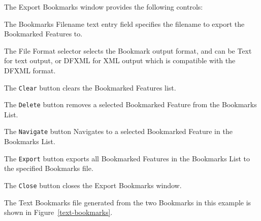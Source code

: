 \documentclass[10pt,twoside]{article}
\begin{document}
The Export Bookmarks window provides the following controls:
\begin{compactitem}
\item The Bookmarks Filename text entry field specifies the filename
to export the Bookmarked Features to.
\item The File Format selector selects the Bookmark output format, and can be Text
for text output, or DFXML for XML output which is compatible with the DFXML format.
\item The \texttt{Clear} button clears the Bookmarked Features list.
\item The \texttt{Delete} button removes a selected Bookmarked Feature from the Bookmarks List.
\item The \texttt{Navigate} button Navigates to a selected Bookmarked Feature in the Bookmarks List.
\item The \texttt{Export} button exports all Bookmarked Features
in the Bookmarks List to the specified Bookmarks file.
\item The \texttt{Close} button closes the Export Bookmarks window.
\end{compactitem}
The Text Bookmarks file generated from the two Bookmarks in this example is shown
in Figure~\ref{text-bookmarks}.
\end{document}
